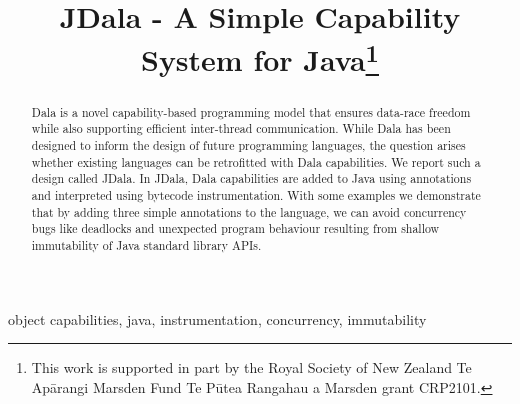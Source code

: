 \documentclass[conference]{IEEEtran}
\newcommand{\dala}{Dala\xspace}
\newcommand{\jdala}{JDala\xspace}
\begin{document}
\title{JDala - A Simple Capability System for Java\thanks{This work is supported in part by the Royal Society of New
  Zealand Te Ap\={a}rangi Marsden Fund Te P\={u}tea Rangahau a Marsden
  grant CRP2101.}
}


\author{
}
\maketitle

\begin{abstract}
\dala is a novel capability-based programming model that ensures data-race freedom while also supporting efficient inter-thread communication. While \dala has been designed to inform the design of future programming languages, the question arises whether existing languages can be retrofitted with \dala capabilities. We report such a design called \jdala. In \jdala,  \dala capabilities are added to Java using annotations and interpreted using bytecode instrumentation. With some examples we demonstrate that by adding three simple annotations to the language, we can avoid concurrency bugs like deadlocks and unexpected program behaviour resulting from shallow immutability of Java standard library APIs. 

\end{abstract}

\begin{IEEEkeywords}
object capabilities, java, instrumentation, concurrency, immutability 
\end{IEEEkeywords}

















\end{document}
